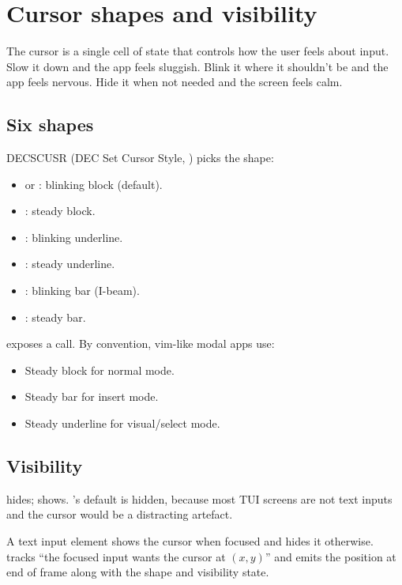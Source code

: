 \chapter{Cursor shapes and visibility}
\label{ch:cursor}

\begin{aside}
The cursor is a single cell of state that controls how the user
feels about input. Slow it down and the app feels sluggish.
Blink it where it shouldn't be and the app feels nervous. Hide
it when not needed and the screen feels calm.
\end{aside}

\section{Six shapes}

DECSCUSR (DEC Set Cursor Style, \code{ESC [ N q}) picks the
shape:

\begin{itemize}[leftmargin=*]
  \item {} or : blinking block (default).
  \item {}: steady block.
  \item {}: blinking underline.
  \item {}: steady underline.
  \item {}: blinking bar (I-beam).
  \item {}: steady bar.
\end{itemize}

\maya{} exposes a  call. By
convention, vim-like modal apps use:

\begin{itemize}[leftmargin=*]
  \item Steady block for normal mode.
  \item Steady bar for insert mode.
  \item Steady underline for visual/select mode.
\end{itemize}

\section{Visibility}

\code{ESC [ ? 25 l} hides; \code{ESC [ ? 25 h} shows. \maya{}'s
default is hidden, because most TUI screens are not text inputs
and the cursor would be a distracting artefact.

A text input element shows the cursor when focused and hides
it otherwise. \maya{} tracks ``the focused input wants the
cursor at $(x, y)$'' and emits the position at end of frame
along with the shape and visibility state.

